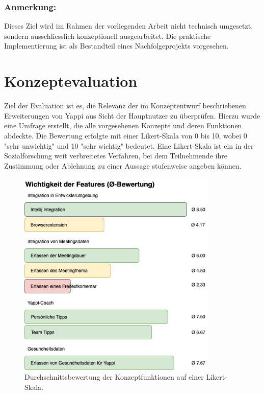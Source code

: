\documentclass[12pt,a4paper]{report}
\begin{document}
\subsubsection{Anmerkung:}

Dieses Ziel wird im Rahmen der vorliegenden Arbeit nicht technisch umgesetzt, sondern ausschliesslich konzeptionell ausgearbeitet.
Die praktische Implementierung ist als Bestandteil eines Nachfolgeprojekts vorgesehen.

\section{Konzeptevaluation}

Ziel der Evaluation ist es, die Relevanz der im Konzeptentwurf beschriebenen Erweiterungen von Yappi aus
Sicht der Hauptnutzer zu überprüfen.
Hierzu wurde eine Umfrage erstellt, die alle vorgesehenen Konzepte und deren Funktionen abdeckte.
Die Bewertung erfolgte mit einer Likert-Skala von 0 bis 10, wobei 0 "sehr unwichtig" und 10 "sehr wichtig" bedeutet.
Eine Likert-Skala ist ein in der Sozialforschung weit verbreitetes Verfahren, bei dem Teilnehmende ihre Zustimmung
oder Ablehnung zu einer Aussage stufenweise angeben können.

\begin{figure}[H]
  \centering
  \includegraphics[width=0.85\textwidth]{../figures/konzept-eval-feature-wichtigkeit.drawio.png}
  \caption{Durchschnittsbewertung der Konzeptfunktionen auf einer Likert-Skala.}
  \label{fig:konzept-eval-feature-wichtigkeit}
\end{figure}
\end{document}
